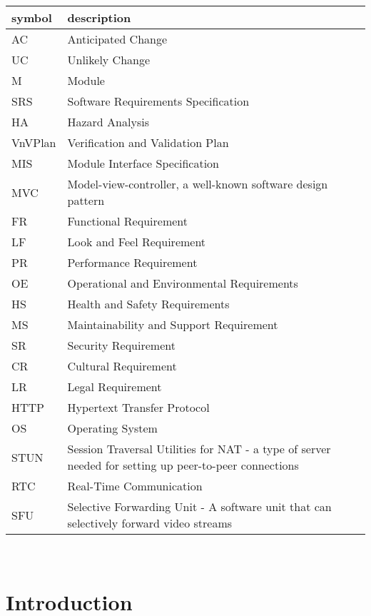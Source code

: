 \documentclass[12pt, titlepage]{article}
\begin{document}
\renewcommand{\arraystretch}{1.2}
\begin{tabular}{l l} 
  \toprule		
  \textbf{symbol} & \textbf{description}\\
  \midrule 
  AC & Anticipated Change\\
  UC & Unlikely Change \\
  M & Module \\
  SRS & Software Requirements Specification \\
  HA & Hazard Analysis \\
  VnVPlan & Verification and Validation Plan\\
  MIS & Module Interface Specification\\
  MVC & Model-view-controller, a well-known software design pattern \\
  FR & Functional Requirement \\
  LF & Look and Feel Requirement \\
  PR & Performance Requirement \\
  OE & Operational and Environmental Requirements \\
  HS & Health and Safety Requirements \\
  MS & Maintainability and Support Requirement \\
  SR & Security Requirement \\
  CR & Cultural Requirement \\
  LR & Legal Requirement\\
  HTTP & Hypertext Transfer Protocol \\
  OS &  Operating System\\
  STUN & Session Traversal Utilities for NAT - a type of server needed for setting up peer-to-peer connections \\
  RTC & Real-Time Communication  \\
  SFU & Selective Forwarding Unit - A software unit that can selectively forward video streams \\
  
  \bottomrule
\end{tabular}\\

\newpage

\tableofcontents

\listoftables

\listoffigures

\newpage


\section{Introduction}
\end{document}
